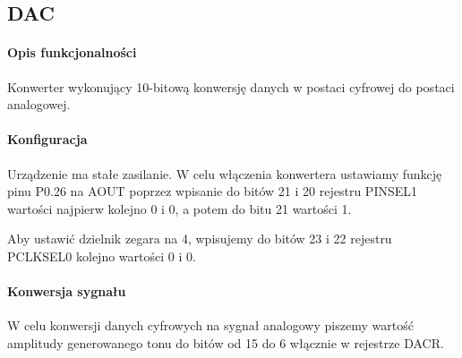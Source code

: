 \subsection{DAC} \label{dac}
    
\paragraph{Opis funkcjonalności}

    Konwerter wykonujący 10-bitową konwersję danych w postaci cyfrowej
    do postaci analogowej.

\paragraph{Konfiguracja}

    Urządzenie ma stałe zasilanie. W celu włączenia konwertera ustawiamy
    funkcję pinu P0.26 na AOUT poprzez wpisanie do bitów 21 i 20
    rejestru PINSEL1 wartości najpierw kolejno 0 i 0, a potem do bitu
    21 wartości 1.

    Aby ustawić dzielnik zegara na 4, wpisujemy do bitów 23 i 22
    rejestru PCLKSEL0 kolejno wartości 0 i 0.

\paragraph{Konwersja sygnału}

    W celu konwersji danych cyfrowych na sygnał analogowy piszemy
    wartość amplitudy generowanego tonu do bitów od 15 do 6 włącznie
    w rejestrze DACR. 

